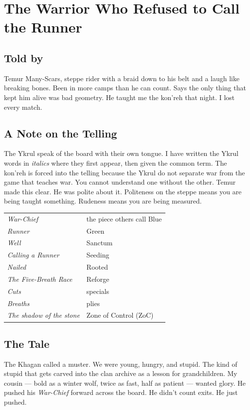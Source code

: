 \chapter{The Warrior Who Refused to Call the Runner}

\section*{Told by}

Temur Many-Scars, steppe rider with a braid down to his belt and a laugh like breaking bones. Been in more camps than he can count. Says the only thing that kept him alive was bad geometry. He taught me the kon'reh that night. I lost every match.

\section*{A Note on the Telling}

The Ykrul speak of the board with their own tongue. I have written the Ykrul words in \textit{italics} where they first appear, then given the common term. The kon'reh is forced into the telling because the Ykrul do not separate war from the game that teaches war. You cannot understand one without the other. Temur made this clear. He was polite about it. Politeness on the steppe means you are being taught something. Rudeness means you are being measured.

\medskip
\noindent\begin{tabular}{ll}
\textit{War-Chief} & the piece others call Blue \\
\textit{Runner} & Green \\
\textit{Well} & Sanctum \\
\textit{Calling a Runner} & Seeding \\
\textit{Nailed} & Rooted \\
\textit{The Five-Breath Race} & Reforge \\
\textit{Cuts} & specials \\
\textit{Breaths} & plies \\
\textit{The shadow of the stone} & Zone of Control (ZoC)
\end{tabular}

\section*{The Tale}

The Khagan called a muster. We were young, hungry, and stupid. The kind of stupid that gets carved into the clan archive as a lesson for grandchildren. My cousin --- bold as a winter wolf, twice as fast, half as patient --- wanted glory. He pushed his \textit{War-Chief} forward across the board. He didn't count exits. He just pushed.

